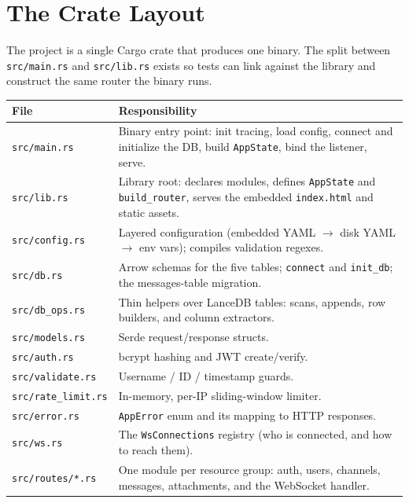 \section{The Crate Layout}

The project is a single Cargo crate that produces one binary. The split between
\verb|src/main.rs| and \verb|src/lib.rs| exists so tests can link against the
library and construct the same router the binary runs.

\begin{center}
\begin{longtable}{@{}p{}p{}@{}}
\toprule
\textbf{File} & \textbf{Responsibility} \\
\midrule
\endhead
\verb|src/main.rs| & Binary entry point: init tracing, load config, connect and initialize the DB, build \verb|AppState|, bind the listener, serve. \\
\verb|src/lib.rs| & Library root: declares modules, defines \verb|AppState| and \verb|build_router|, serves the embedded \verb|index.html| and static assets. \\
\verb|src/config.rs| & Layered configuration (embedded YAML $\to$ disk YAML $\to$ env vars); compiles validation regexes. \\
\verb|src/db.rs| & Arrow schemas for the five tables; \verb|connect| and \verb|init_db|; the messages-table migration. \\
\verb|src/db_ops.rs| & Thin helpers over LanceDB tables: scans, appends, row builders, and column extractors. \\
\verb|src/models.rs| & Serde request/response structs. \\
\verb|src/auth.rs| & bcrypt hashing and JWT create/verify. \\
\verb|src/validate.rs| & Username / ID / timestamp guards. \\
\verb|src/rate_limit.rs| & In-memory, per-IP sliding-window limiter. \\
\verb|src/error.rs| & \verb|AppError| enum and its mapping to HTTP responses. \\
\verb|src/ws.rs| & The \verb|WsConnections| registry (who is connected, and how to reach them). \\
\verb|src/routes/*.rs| & One module per resource group: auth, users, channels, messages, attachments, and the WebSocket handler. \\
\bottomrule
\end{longtable}
\end{center}

